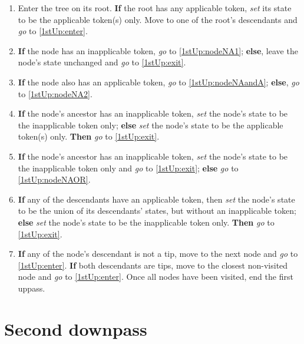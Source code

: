 \documentclass[a4paper,12pt]{article}
\begin{document}
\begin{enumerate}
    \item Enter the tree on its root. \textbf{If} the root has any applicable token, \textit{set} its state to be the applicable token(s) only. Move to one of the root's descendants and \textit{go} to \ref{1stUp:enter}.
    \item \label{1stUp:enter} \textbf{If} the node has an inapplicable token, \textit{go} to \ref{1stUp:nodeNA1}; \textbf{else}, leave the node's state unchanged and \textit{go} to \ref{1stUp:exit}.
    \item \label{1stUp:nodeNA1} \textbf{If} the node also has an applicable token, \textit{go} to \ref{1stUp:nodeNAandA}; \textbf{else}, \textit{go} to \ref{1stUp:nodeNA2}.
    \item \label{1stUp:nodeNAandA} \textbf{If} the node's ancestor has an inapplicable token, \textit{set} the node's state to be the inapplicable token only; \textbf{else} \textit{set} the node's state to be the applicable token(s) only. \textbf{Then} \textit{go} to \ref{1stUp:exit}.
    \item \label{1stUp:nodeNA2} \textbf{If} the node's ancestor has an inapplicable token, \textit{set} the node's state to be the inapplicable token only and \textit{go} to \ref{1stUp:exit}; \textbf{else} \textit{go} to \ref{1stUp:nodeNAOR}.
    \item \label{1stUp:nodeNAOR} \textbf{If} any of the descendants have an applicable token, then \textit{set} the node's state to be the union of its descendants' states, but without an inapplicable token; \textbf{else} \textit{set} the node's state to be the inapplicable token only. \textbf{Then} \textit{go} to \ref{1stUp:exit}.
    \item \label{1stUp:exit} \textbf{If} any of the node's descendant is not a tip, move to the next node and \textit{go} to \ref{1stUp:enter}. \textbf{If} both descendants are tips, move to the closest non-visited node and \textit{go} to \ref{1stUp:enter}. Once all nodes have been visited, end the first uppass.
\end{enumerate}


\section{Second downpass} \label{2ndDp}
\end{document}
